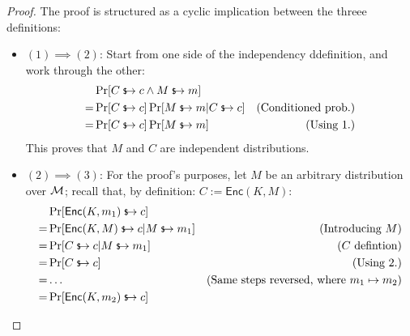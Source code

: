 \begin{proof}
    The proof is structured as a cyclic implication between the threee definitions:
    
    \begin{itemize}
        \item $(1) \implies (2)$: Start from one side of the independency ddefinition, and work through the other:
        \begin{align*}
            & \Pr[C \evaluatesto c \wedge M \evaluatesto m] \\
            =& \Pr[C \evaluatesto c] \Pr[M \evaluatesto m|C \evaluatesto c] & \text{(Conditioned prob.)} \\
            =& \Pr[C \evaluatesto c] \Pr[M \evaluatesto m] & \text{(Using 1.)} \\
        \end{align*}
        This proves that $M$ and $C$ are independent distributions.
        
        \item $(2) \implies (3)$: For the proof's purposes, let $M$ be an arbitrary distribution over $\mathcal{M}$; recall that, by definition: $C := \textsf{Enc}(K, M)$:
        \begin{align*}
            & \Pr[\textsf{Enc}(K, m_1) \evaluatesto c] & \\
            =& \Pr[\textsf{Enc}(K, M) \evaluatesto c| M \evaluatesto m_1] & \text{(Introducing $M$)} \\
            =& \Pr[C \evaluatesto c|M \evaluatesto m_1] & \text{($C$ defintion)} \\
            =& \Pr[C \evaluatesto c] & \text{(Using 2.)} \\
            =& \dots & \text{(Same steps reversed, where $m_1 \mapsto m_2$)} \\
            =& \Pr[\textsf{Enc}(K, m_2) \evaluatesto c] & 
        \end{align*}



\end{itemize}
\end{proof}
